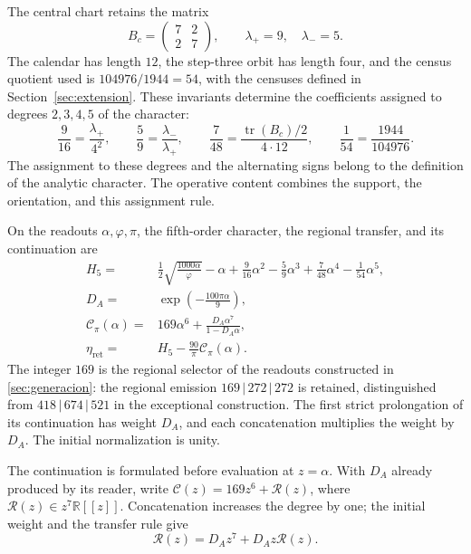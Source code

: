 The central chart retains the matrix
\[
 B_c=\begin{pmatrix}7&2\\2&7\end{pmatrix},
 \qquad\lambda_+=9,\quad\lambda_-=5.
\]
The calendar has length \(12\), the step-three orbit has length
four, and the census quotient used is
\(104976/1944=54\), with the censuses defined in
Section~\ref{sec:extension}. These invariants determine the coefficients
assigned to degrees \(2,3,4,5\) of the character:
\begin{equation}
 \frac9{16}=\frac{\lambda_+}{4^2},\qquad
 \frac59=\frac{\lambda_-}{\lambda_+},\qquad
 \frac7{48}=\frac{\operatorname{tr}(B_c)/2}{4\cdot12},
 \qquad
 \frac1{54}=\frac{1944}{104976}.
 \label{iv:action:coeficientes}
\end{equation}
The assignment to these degrees and the alternating signs belong
to the definition of the analytic character. The operative content
combines the support, the orientation, and this assignment rule.

\begin{definition}
\label{iv:action:lectores}
On the readouts \(\alpha,\varphi,\pi\), the fifth-order character,
the regional transfer, and its continuation are
\begin{align}
 H_5={}&\frac12\sqrt{\frac{1000\alpha}{\varphi}}-\alpha
       +\frac9{16}\alpha^2-\frac59\alpha^3
       +\frac7{48}\alpha^4-\frac1{54}\alpha^5,
       \label{iv:action:h5}\\
 D_A={}&\exp\!\left(-\frac{100\pi\alpha}{9}\right),
       \label{iv:action:da}\\
 \mathcal C_\pi(\alpha)={}&169\alpha^6+
       \frac{D_A\alpha^7}{1-D_A\alpha},
       \label{iv:action:cpi}\\
 \eta_{\mathrm{ret}}={}&H_5-\frac{90}{\pi}\mathcal C_\pi(\alpha).
       \label{iv:action:eta-ret}
\end{align}
The integer \(169\) is the regional selector of the readouts
constructed in \ref{sec:generacion}: the regional emission
\(169\,|\,272\,|\,272\) is retained, distinguished from
\(418\,|\,674\,|\,521\) in the exceptional construction.
The first strict prolongation of its continuation has weight
\(D_A\), and each concatenation multiplies the weight by
\(D_A\). The initial normalization is unity.
\end{definition}

The continuation is formulated before evaluation at \(z=\alpha\).
With \(D_A\) already produced by its reader, write
\(\mathscr C(z)=169z^6+\mathscr R(z)\), where
\(\mathscr R(z)\in z^7\mathbb R[[z]]\).
Concatenation increases the degree by one; the initial weight
and the transfer rule give
\begin{equation}
 \mathscr R(z)=D_Az^7+D_Az\mathscr R(z).
 \label{iv:action:renovacion}
\end{equation}

